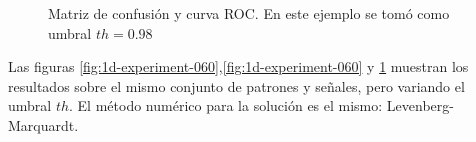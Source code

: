 \begin{figure}
	\centering
	\caption{Matriz de confusión y curva ROC. En este ejemplo se tomó como umbral $th=0.98$} \label{fig:1d-experiment-098}
\end{figure}

Las figuras \ref{fig:1d-experiment-060},\ref{fig:1d-experiment-060} y \ref{fig:1d-experiment-098} muestran los resultados 
sobre el mismo conjunto de patrones y señales, pero variando el umbral $th$. El método numérico para la solución es el
mismo: Levenberg-Marquardt.

